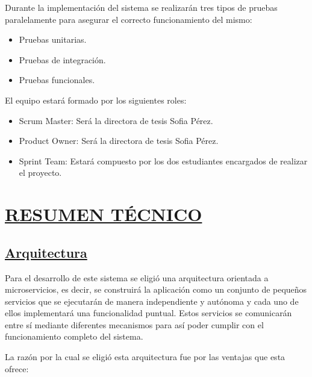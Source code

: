 Durante la implementación del sistema se realizarán tres tipos de pruebas paralelamente para asegurar el correcto funcionamiento del mismo:

\begin{itemize}
	\item Pruebas unitarias.
	\item Pruebas de integración.
	\item Pruebas funcionales.\\
\end{itemize}

El equipo estará formado por los siguientes roles:
\begin{itemize}
	\item Scrum Master: Será la directora de tesis Sofia Pérez.
	\item Product Owner: Será la directora de tesis Sofia Pérez.
	\item Sprint Team: Estará compuesto por los dos estudiantes encargados de realizar el proyecto.\\
\end{itemize}

\section*{\underline{RESUMEN TÉCNICO}}

\subsection*{\underline{Arquitectura}}

Para el desarrollo de este sistema se eligió una arquitectura orientada a microservicios, es decir, se construirá la aplicación como un conjunto de pequeños servicios que se ejecutarán de manera independiente y autónoma y cada uno de ellos implementará una funcionalidad puntual. Estos servicios se comunicarán entre sí mediante diferentes mecanismos para así poder cumplir con el funcionamiento completo del sistema.

La razón por la cual se eligió esta arquitectura fue por las ventajas que esta ofrece:

